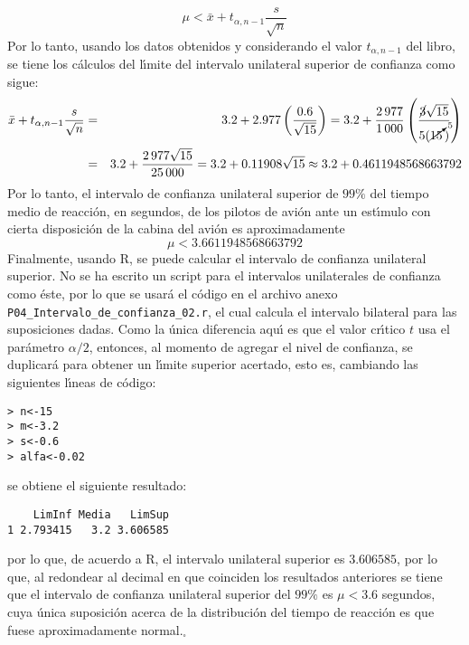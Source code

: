 \begin{solucion}
\begin{enumerate}
\begin{equation*}
   \mu < \bar{x} + t_{\alpha,n-1}\frac{s}{\sqrt{n}}
  \end{equation*}
  Por lo tanto, usando los datos obtenidos y considerando el valor $t_{\alpha,n-1}$ del libro, se tiene los c\'alculos del l\'{\i}mite del intervalo unilateral superior de confianza como sigue:
  \begin{eqnarray*}
   \bar{x} + t_{\alpha,n-1}\frac{s}{\sqrt{n}} & = & 3.2 + 2.977\left( \frac{0.6}{\sqrt{15}} \right) = 3.2 + \frac{2\,977}{1\,000}\left( \frac{\cancel{3}\sqrt{15}}{5(\cancelto{5}{15} \,)} \right) \\
   & = & 3.2 + \frac{2\,977\sqrt{15}}{25\,000} = 3.2 + 0.11908\sqrt{15} \approx 3.2 + 0.4611948568663792
  \end{eqnarray*}
  Por lo tanto, el intervalo de confianza unilateral superior de $99\%$ del tiempo medio de reacci\'on, en segundos, de los pilotos de avi\'on ante un est\'{\i}mulo con cierta disposici\'on de la cabina del avi\'on es aproximadamente
  \begin{equation*}
   \mu < 3.6611948568663792
  \end{equation*}
  Finalmente, usando R, se puede calcular el intervalo de confianza unilateral superior. No se ha escrito un script para el intervalos unilaterales de confianza como \'este, por lo que se usar\'a el c\'odigo en el archivo anexo \texttt{P04\_Intervalo\_de\_confianza\_02.r}, el cual calcula el intervalo bilateral para las suposiciones dadas. Como la \'unica diferencia aqu\'{\i} es que el valor cr\'{\i}tico $t$ usa el par\'ametro $\alpha/2$, entonces, al momento de agregar el nivel de confianza, se duplicar\'a para obtener un l\'{\i}mite superior acertado, esto es, cambiando las siguientes l\'{\i}neas de c\'odigo:
  \begin{verbatim}
> n<-15
> m<-3.2
> s<-0.6
> alfa<-0.02
  \end{verbatim}
  \vspace{-0.5cm}
  se obtiene el siguiente resultado:
  \begin{verbatim}
    LimInf Media   LimSup
1 2.793415   3.2 3.606585
  \end{verbatim}
  \vspace{-0.5cm}
  por lo que, de acuerdo a R, el intervalo unilateral superior es $3.606585$, por lo que, al redondear al decimal en que coinciden los resultados anteriores se tiene que el intervalo de confianza unilateral superior del $99\%$ es $\mu < 3.6$ segundos, cuya \'unica suposici\'on acerca de la distribuci\'on del tiempo de reacci\'on es que fuese aproximadamente normal.${}_{\square}$
  

\end{enumerate}
\end{solucion}
